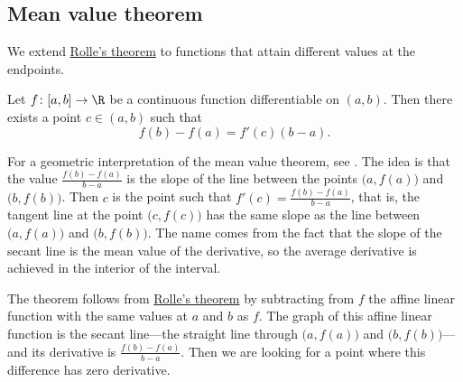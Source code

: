 \subsection{Mean value theorem}

We extend \hyperref[thm:rolle]{Rolle's theorem}
to functions that attain different
values at the endpoints.

\begin{thm} \label{thm:mvt}
Let $f \colon [a,b] \to \R$ be a continuous function
differentiable on $(a,b)$.  Then there exists a point $c \in (a,b)$
such that
\begin{equation*}
f(b)-f(a) = f'(c)(b-a) .
\end{equation*}
\end{thm}

For a geometric interpretation of the mean value theorem, see
.  The idea is that the value $\frac{f(b)-f(a)}{b-a}$
is the slope of the line between the points $\bigl(a,f(a)\bigr)$
and $\bigl(b,f(b)\bigr)$.
Then $c$ is the point such that $f'(c) = \frac{f(b)-f(a)}{b-a}$, that 
is, the tangent line at the point $\bigl(c,f(c)\bigr)$ has the same slope as the
line between $\bigl(a,f(a)\bigr)$ and $\bigl(b,f(b)\bigr)$.
The name comes from the fact that the slope of the secant line
is the mean value of the derivative, so the average derivative is achieved
in the interior of the interval.

The theorem follows from \hyperref[thm:rolle]{Rolle's theorem}
by subtracting from $f$ the affine linear function
with the same values at $a$ and $b$ as $f$.
The graph of this affine linear function is the 
secant line---the straight line through
$\bigl(a,f(a)\bigr)$ and $\bigl(b,f(b)\bigr)$---and
its derivative is
$\frac{f(b)-f(a)}{b-a}$.
Then we are looking for a point where this
difference has zero derivative.

\begin{myfigureht}
\caption{Graphical interpretation of the mean value theorem.\label{mvtfig}}
\end{myfigureht}


